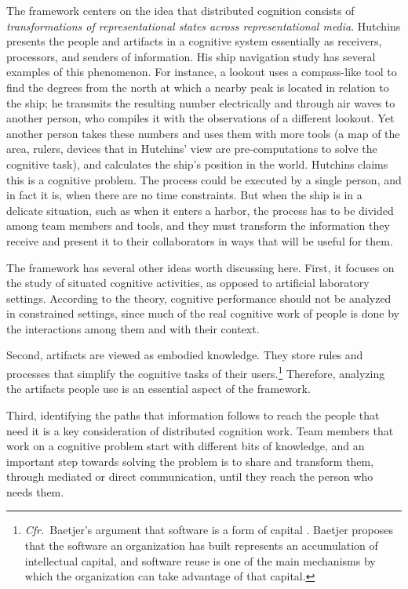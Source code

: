 The framework centers on the idea that distributed cognition consists of \emph{transformations of representational states across representational media}. Hutchins presents the people and artifacts in a cognitive system essentially as receivers, processors, and senders of information. His ship navigation study has several examples of this phenomenon. For instance, a lookout uses a compass-like tool to find the degrees from the north at which a nearby peak is located in relation to the ship; he transmits the resulting number electrically and through air waves to another person, who compiles it with the observations of a different lookout. Yet another person takes these numbers and uses them with more tools (a map of the area, rulers, devices that in Hutchins' view are pre-computations to solve the cognitive task), and calculates the ship's position in the world. Hutchins claims this is a cognitive problem. The process could be executed by a single person, and in fact it is, when there are no time constraints. But when the ship is in a delicate situation, such as when it enters a harbor, the process has to be divided among team members and tools, and they must transform the information they receive and present it to their collaborators in ways that will be useful for them.

The framework has several other ideas worth discussing here. First, it focuses on the study of situated cognitive activities, as opposed to artificial laboratory settings. According to the theory, cognitive performance should not be analyzed in constrained settings, since much of the real cognitive work of people is done by the interactions among them and with their context.

Second, artifacts are viewed as embodied knowledge. They store rules and processes that simplify the cognitive tasks of their users.\footnote{\emph{Cfr.}\ Baetjer's argument that software is a form of capital \cite{Baetjer1997}. Baetjer proposes that the software an organization has built represents an accumulation of intellectual capital, and software reuse is one of the main mechanisms by which the organization can take advantage of that capital.} Therefore, analyzing the artifacts people use is an essential aspect of the framework.

Third, identifying the paths that information follows to reach the people that need it is a key consideration of distributed cognition work. Team members that work on a cognitive problem start with different bits of knowledge, and an important step towards solving the problem is to share and transform them, through mediated or direct communication, until they reach the person who needs them.

